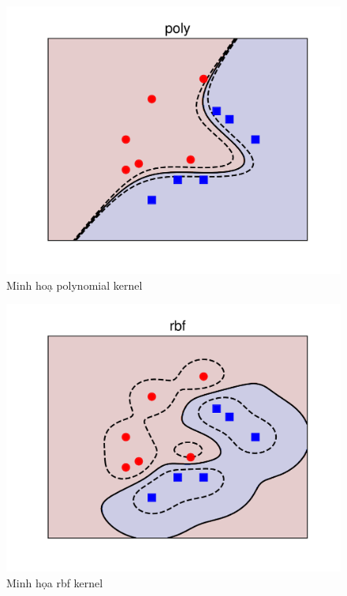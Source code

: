 \documentclass[a4paper, 12pt, oneside]{report}
\begin{document}
\begin{center}
    \begin{figure}[H]
    \begin{center}
     \includegraphics[scale=0.1]{kn2}
    \end{center}
    \caption{Minh hoạ polynomial kernel}
    \label{refhinh1}
    \end{figure}
\end{center}
\begin{center}
    \begin{figure}[H]
    \begin{center}
     \includegraphics[scale=0.1]{kn3}
    \end{center}
    \caption{Minh họa rbf kernel}
    \label{refhinh1}
    \end{figure}
\end{center}
\end{document}
